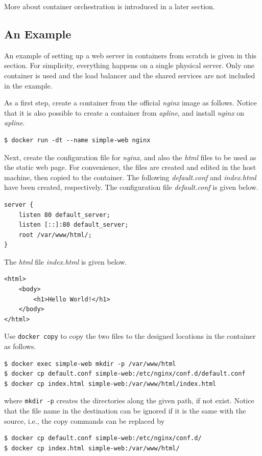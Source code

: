 More about container orchestration is introduced in a later section.

\subsection{An Example}

An example of setting up a web server in containers from scratch is given in this section. For simplicity, everything happens on a single physical server. Only one container is used and the load balancer and the shared services are not included in the example.

As a first step, create a container from the official \textit{nginx} image as follows. Notice that it is also possible to create a container from \textit{apline}, and install \textit{nginx} on \textit{apline}.
\begin{lstlisting}
$ docker run -dt --name simple-web nginx
\end{lstlisting}

Next, create the configuration file for \textit{nginx}, and also the \textit{html} files to be used as the static web page. For convenience, the files are created and edited in the host machine, then copied to the container. The following \textit{default.conf} and \textit{index.html} have been created, respectively. The configuration file \textit{default.conf} is given below.
\begin{lstlisting}
server {
	listen 80 default_server;
	listen [::]:80 default_server;
	root /var/www/html/;
}
\end{lstlisting}
The \textit{html} file \textit{index.html} is given below.
\begin{lstlisting}
<html>
	<body>
		<h1>Hello World!</h1>
	</body>
</html>
\end{lstlisting}
Use \verb|docker copy| to copy the two files to the designed locations in the container as follows.
\begin{lstlisting}
$ docker exec simple-web mkdir -p /var/www/html
$ docker cp default.conf simple-web:/etc/nginx/conf.d/default.conf
$ docker cp index.html simple-web:/var/www/html/index.html
\end{lstlisting}
where \verb|mkdir -p| creates the directories along the given path, if not exist. Notice that the file name in the destination can be ignored if it is the same with the source, i.e., the copy commands can be replaced by
\begin{lstlisting}
$ docker cp default.conf simple-web:/etc/nginx/conf.d/
$ docker cp index.html simple-web:/var/www/html/
\end{lstlisting}

